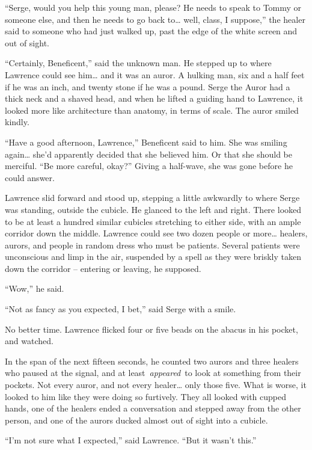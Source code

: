 ``Serge, would you help this young man, please? He needs to speak to
Tommy or someone else, and then he needs to go back to\ldots{} well,
class, I suppose,'' the healer said to someone who had just walked up,
past the edge of the white screen and out of sight.

``Certainly, Beneficent,'' said the unknown man. He stepped up to where
Lawrence could see him\ldots{} and it was an auror. A hulking man, six
and a half feet if he was an inch, and twenty stone if he was a pound.
Serge the Auror had a thick neck and a shaved head, and when he lifted a
guiding hand to Lawrence, it looked more like architecture than anatomy,
in terms of scale. The auror smiled kindly.

``Have a good afternoon, Lawrence,'' Beneficent said to him. She was
smiling again\ldots{} she'd apparently decided that she believed him. Or
that she should be merciful. ``Be more careful, okay?'' Giving a
half-wave, she was gone before he could answer.

Lawrence slid forward and stood up, stepping a little awkwardly to where
Serge was standing, outside the cubicle. He glanced to the left and
right. There looked to be at least a hundred similar cubicles stretching
to either side, with an ample corridor down the middle. Lawrence could
see two dozen people or more\ldots{} healers, aurors, and people in
random dress who must be patients. Several patients were unconscious and
limp in the air, suspended by a spell as they were briskly taken down
the corridor -- entering or leaving, he supposed.

``Wow,'' he said.

``Not as fancy as you expected, I bet,'' said Serge with a smile.

No better time. Lawrence flicked four or five beads on the abacus in his
pocket, and watched.

In the span of the next fifteen seconds, he counted two aurors and three
healers who paused at the signal, and at least~\emph{appeared}~to look
at something from their pockets. Not every auror, and not every
healer\ldots{} only those five. What is worse, it looked to him like
they were doing so furtively. They all looked with cupped hands, one of
the healers ended a conversation and stepped away from the other person,
and one of the aurors ducked almost out of sight into a cubicle.

``I'm not sure what I expected,'' said Lawrence. ``But it wasn't this.''

\mybreak

